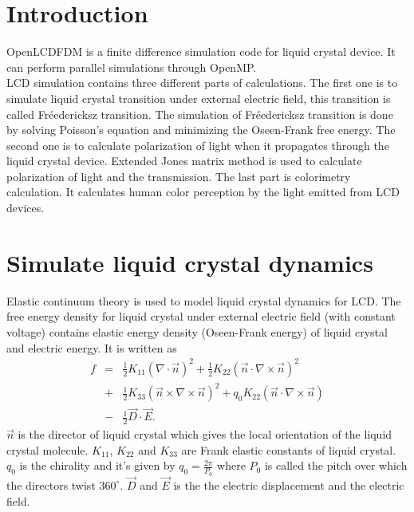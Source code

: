 \documentclass[11pt, a4paper]{article} %
\begin{document}
\begin{multicols}{2}
\section{Introduction}
OpenLCDFDM is a finite difference simulation code for liquid crystal device. It can perform parallel simulations through OpenMP. \\

LCD simulation contains three different parts of calculations. The first one is to simulate liquid crystal transition under external electric field, this transition is called Fréedericksz transition. The simulation of Fréedericksz transition is done by solving Poisson's equation and minimizing the Oseen-Frank free energy. The second one is to calculate polarization of light when it propagates through the liquid crystal device. Extended Jones matrix method is used to calculate polarization of light and the transmission. The last part is colorimetry calculation. It calculates human color perception by the light emitted from LCD devices.\\

\section{Simulate liquid crystal dynamics}
Elastic continuum theory is used to model liquid crystal dynamics for LCD. The free energy density for liquid crystal under external electric field (with constant voltage) contains elastic energy density (Oseen-Frank energy) of liquid crystal and electric energy. It is written as 
\begin{eqnarray}
f&=&\frac{1}{2}K_{11}(\nabla\cdot\vec{n})^2 + \frac{1}{2}K_{22}(\vec{n}\cdot\nabla\times\vec{n})^2 \nonumber \\
&+& \frac{1}{2}K_{33}(\vec{n}\times\nabla\times\vec{n})^2 + q_{0}K_{22}(\vec{n}\cdot\nabla\times\vec{n}) \nonumber \\
&-&\frac{1}{2}\vec{D}\cdot\vec{E}.
\label{eq:oseen_frank}
\end{eqnarray}
$\vec{n}$ is the director of liquid crystal which gives the local orientation of the liquid crystal molecule. $K_{11}$, $K_{22}$ and $K_{33}$ are Frank elastic constants of liquid crystal. $q_0$ is the chirality and it's given by $q_0 = \frac{2\pi}{P_0}$ where $P_0$ is called the pitch over which the directors twist $360^{\circ}$. $\vec{D}$ and $\vec{E}$ is the the electric displacement and the electric field.


\end{multicols}
\end{document}
